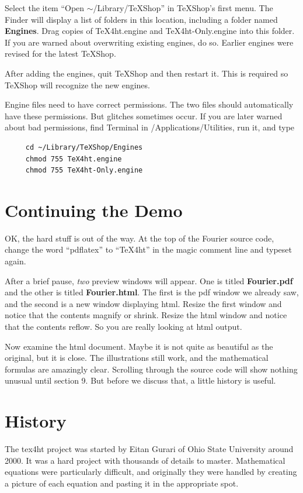 \documentclass[11pt, oneside]{article}   	%
\begin{document}
\newpage
Select the item 
``Open $\sim$/Library/TeXShop'' in TeXShop's first menu.  The Finder will display a  list of folders in this location, including a folder named {\bf Engines}. 
Drag copies of  TeX4ht.engine and TeX4ht-Only.engine into this folder.
If you are warned about overwriting existing engines, do so. Earlier engines were revised for the latest TeXShop. 

After adding the engines, quit TeXShop and then restart it. This is required so TeXShop will recognize the new engines.

Engine files need to have correct permissions. The two files should automatically have these permissions.
But glitches sometimes occur. If you are later warned about bad permissions, find Terminal in /Applications/Utilities, run it,  and type
\begin{verbatim}
     cd ~/Library/TeXShop/Engines
     chmod 755 TeX4ht.engine
     chmod 755 TeX4ht-Only.engine
\end{verbatim}

\section{Continuing the Demo}
OK, the hard stuff is out of the way. At the top of the Fourier source code, change the word ``pdflatex''
to ``TeX4ht'' in the magic comment line and typeset again.

After a brief pause, {\em two} preview windows will appear. One is titled {\bf Fourier.pdf}
and the other is titled {\bf Fourier.html}. The first is the pdf window we already saw, and
the second is a new window displaying html. Resize the first window and notice that the
contents magnify or shrink. Resize the html window and notice that the contents reflow. So you are really looking at html output.

Now examine the html document. Maybe it is not quite as beautiful as the original, but it is close.
The illustrations still work, and the mathematical formulas are amazingly clear. Scrolling through
the source code will show nothing unusual until section 9. But before we discuss that, a little history
is useful.

\section{History}

The tex4ht project was started by Eitan Gurari of Ohio State University
around 2000. It was a hard project with thousands of details to master. Mathematical equations
were particularly difficult, and originally they were handled by creating a  picture of each
equation and pasting it in the appropriate spot.
\end{document}
